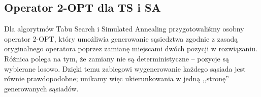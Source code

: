 \subsection{Operator 2-OPT dla TS i SA}

Dla algorytmów Tabu Search i Simulated Annealing przygotowaliśmy osobny operator 2-OPT, który umożliwia generowanie sąsiedztwa zgodnie z zasadą oryginalnego operatora poprzez zamianę miejscami dwóch pozycji w rozwiązaniu. Różnica polega na tym, że zamiany nie są deterministyczne -- pozycje są wybierane losowo. Dzięki temu zabiegowi wygenerowanie każdego sąsiada jest równie prawdopodobne; unikamy więc ukierunkowania w jedną ,,stronę'' generowanych sąsiadów.